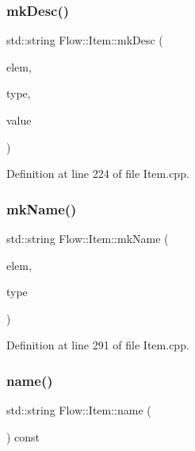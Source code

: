 \subsubsection{\texorpdfstring{mk\+Desc()}{mkDesc()}}
{\footnotesize\ttfamily std\+::string Flow\+::\+Item\+::mk\+Desc (\begin{DoxyParamCaption}\item[{unsigned char}]{elem,  }\item[{\hyperlink{namespace_flow_ab521722c5aec75faa5be9c5ccfff33d6}{Itm\+Type}}]{type,  }\item[{unsigned char}]{value }\end{DoxyParamCaption})\hspace{0.3cm}{\ttfamily [static]}}



Definition at line 224 of file Item.\+cpp.

\hypertarget{class_flow_1_1_item_a65adc1636106d296d0326ac18f27a805}{}\label{class_flow_1_1_item_a65adc1636106d296d0326ac18f27a805} 
\subsubsection{\texorpdfstring{mk\+Name()}{mkName()}}
{\footnotesize\ttfamily std\+::string Flow\+::\+Item\+::mk\+Name (\begin{DoxyParamCaption}\item[{unsigned char}]{elem,  }\item[{\hyperlink{namespace_flow_ab521722c5aec75faa5be9c5ccfff33d6}{Itm\+Type}}]{type }\end{DoxyParamCaption})\hspace{0.3cm}{\ttfamily [static]}}



Definition at line 291 of file Item.\+cpp.

\hypertarget{class_flow_1_1_item_a176977d10b96c739e28870bd928e34f8}{}\label{class_flow_1_1_item_a176977d10b96c739e28870bd928e34f8} 
\subsubsection{\texorpdfstring{name()}{name()}}
{\footnotesize\ttfamily std\+::string Flow\+::\+Item\+::name (\begin{DoxyParamCaption}{ }\end{DoxyParamCaption}) const}



